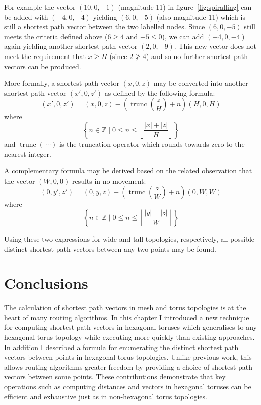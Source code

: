 			For example the vector $(10, 0, -1)$ (magnitude 11) in
			figure~\ref{fig:spiralling} can be added with $(-4, 0, -4)$ yielding $(6,
			0, -5)$ (also magnitude 11) which is still a shortest path vector between
			the two labelled nodes.  Since $(6, 0, -5)$ still meets the criteria
			defined above ($6 \ge 4$ and $-5 \le 0$), we can add $(-4, 0, -4)$ again
			yielding another shortest path vector $(2, 0, -9)$.  This new vector does
			not meet the requirement that $x \ge H$ (since $2 \ngeq 4$) and so no
			further shortest path vectors can be produced.
			
			More formally, a shortest path vector $(x, 0, z)$ may be converted into
			another shortest path vector $(x', 0, z')$ as defined by the following
			formula:
			\begin{equation*}
				(x', 0, z') = (x, 0, z) - \left(\operatorname{trunc}\left(\frac{z}{H}\right) + n\right)(H, 0, H)
			\end{equation*}
			where
			\begin{equation*}
				\left\{
					n \in \mathbb{Z}
				\;\Big|\;
					0 \le n \le
						\left\lfloor
							\frac{\left|x\right| + \left|z\right|}{H}
						\right\rfloor
				\right\}
			\end{equation*}
			and $\operatorname{trunc}(\,\cdots)$ is the truncation operator which
			rounds towards zero to the nearest integer.
			
			A complementary formula may be derived based on the related observation
			that the vector $(W, 0, 0)$ results in no movement:
			\begin{equation*}
				(0, y', z') = (0, y, z) - \left(\operatorname{trunc}\left(\frac{z}{W}\right) + n\right)(0, W, W)
			\end{equation*}
			where
			\begin{equation*}
				\left\{
					n \in \mathbb{Z}
				\;\Big|\;
					0 \le n \le
						\left\lfloor
							\frac{\left|y\right| + \left|z\right|}{W}
						\right\rfloor
				\right\}
			\end{equation*}
			
			Using these two expressions for wide and tall topologies, respectively,
			all possible distinct shortest path vectors between any two points may be
			found.
	
	\section{Conclusions}
		
		The calculation of shortest path vectors in mesh and torus topologies is at
		the heart of many routing algorithms. In this chapter I introduced a new
		technique for computing shortest path vectors in hexagonal toruses which
		generalises to any hexagonal torus topology while executing more quickly
		than existing approaches. In addition I described a formula for enumerating
		the distinct shortest path vectors between points in hexagonal torus
		topologies. Unlike previous work, this allows routing algorithms greater
		freedom by providing a choice of shortest path vectors between some points.
		These contributions demonstrate that key operations such as computing
		distances and vectors in hexagonal toruses can be efficient and exhaustive
		just as in non-hexagonal torus topologies.
